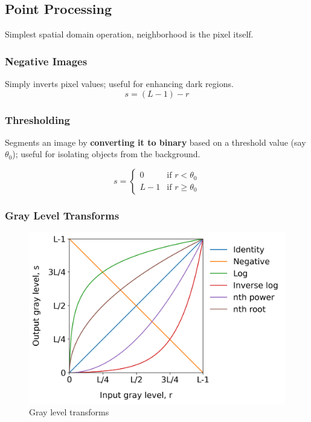 \subsection*{Point Processing}

Simplest spatial domain operation, neighborhood is the pixel itself.

\subsubsection*{Negative Images}

Simply inverts pixel values; useful for enhancing dark regions.
\begin{equation*}
  s = (L - 1) - r
\end{equation*}

\subsubsection*{Thresholding}

Segments an image by \textbf{converting it to binary} based on a
threshold value (say $\theta_0$); useful for isolating objects from
the background.

\begin{equation*}
  s =
  \begin{cases}
    0 & \text{if } r < \theta_0 \\
    L - 1 & \text{if } r \geq \theta_0
  \end{cases}
\end{equation*}

\subsubsection*{Gray Level Transforms}

\begin{figure}[H]
  \centering
  \includegraphics[width=\linewidth]{images/gray_level_transforms.png}
  \caption{Gray level transforms}
\end{figure}


